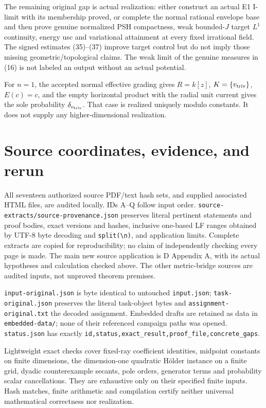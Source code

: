 \documentclass[
  10pt,
]{article}
\begin{document}
The remaining original gap is actual realization: either construct an
actual E1 I-limit with its membership proved, or complete the normal
rational envelope base and then prove genuine normalized PSH
compactness, weak bounded-\(J\) target \(L^1\) continuity, energy usc
and variational attainment at every fixed irrational field. The signed
estimates (35)--(37) improve target control but do not imply those
missing geometric/topological claims. The weak limit of the genuine
measures in (16) is not labeled an output without an actual potential.

For \(n=1\), the accepted normal effective grading gives \(R=k[z]\),
\(K=\{v_{\rm triv}\}\), \(E(c)=c\), and the empty horizontal product
with the radial unit current gives the sole probability
\(\delta_{v_{\rm triv}}\). That case is realized uniquely modulo
constants. It does not supply any higher-dimensional realization.

\section{Source coordinates, evidence, and
rerun}\label{source-coordinates-evidence-and-rerun}

All seventeen authorized source PDF/text hash sets, and supplied
associated HTML files, are audited locally. IDs A--Q follow input order.
\texttt{source-extracts/source-provenance.json} preserves literal
pertinent statements and proof bodies, exact versions and hashes,
inclusive one-based LF ranges obtained by UTF-8 byte decoding and
\texttt{split(\textquotesingle{}\textbackslash{}n\textquotesingle{})},
and application limits. Complete extracts are copied for
reproducibility; no claim of independently checking every page is made.
The main new source application is D Appendix A, with its actual
hypotheses and calculation checked above. The other metric-bridge
sources are audited inputs, not unproved theorem premises.

\texttt{input-original.json} is byte identical to untouched
\texttt{input.json}; \texttt{task-original.json} preserves the literal
task-object bytes and \texttt{assignment-original.txt} the decoded
assignment. Embedded drafts are retained as data in
\texttt{embedded-data/}; none of their referenced campaign paths was
opened. \texttt{status.json} has exactly
\texttt{id,status,exact\_result,proof\_file,concrete\_gaps}.

Lightweight exact checks cover fixed-ray coefficient identities,
midpoint constants on finite dimensions, the dimension-one quadratic
Hölder instance on a finite grid, dyadic counterexample secants, pole
orders, generator terms and probability scalar cancellations. They are
exhaustive only on their specified finite inputs. Hash matches, finite
arithmetic and compilation certify neither universal mathematical
correctness nor realization.
\end{document}
